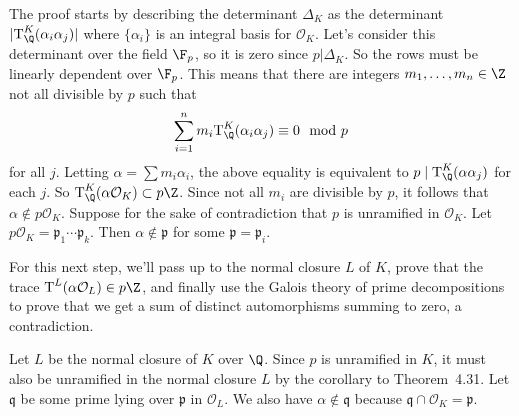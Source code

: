 \documentclass[11pt,letterpaper]{article}
\begin{document}
\begin{solution}
    The proof starts by describing the determinant $\Delta_K$ as the determinant $|\textrm{T}^K_{\Q}(\alpha_i\alpha_j)|$ where $\{\alpha_i\}$ is an integral basis for $\mathcal{O}_K$. Let's consider this determinant over the field $\F_p$, so it is zero since $p|\Delta_K$. So the rows must be linearly dependent over $\F_p$. This means that there are integers $m_1,\ldots,m_n\in \Z$ not all divisible by $p$ such that
    \[
        \sum^n_{i=1} m_i \textrm{T}^K_\Q(\alpha_i\alpha_j)\equiv 0\mod p
    \]
    for all $j$. Letting $\alpha = \sum m_i\alpha_i$, the above equality is equivalent to $p \mid \textrm{T}^K_\Q (\alpha \alpha_j)$ for each $j$. So $\textrm{T}^K_{\Q}(\alpha \mathcal{O}_K) \subset p\Z$. Since not all $m_i$ are divisible by $p$, it follows that $\alpha\not\in p\mathcal{O}_K$. Suppose for the sake of contradiction that $p$ is unramified in $\mathcal{O}_K$. Let $p\mathcal{O}_K=\mathfrak{p}_1\cdots \mathfrak{p}_k$. Then $\alpha\not\in \mathfrak{p}$ for some $\mathfrak{p}=\mathfrak{p}_i$. 
    
    For this next step, we'll pass up to the normal closure $L$ of $K$, prove that the trace $\textrm{T}^L(\alpha \mathcal{O}_L)\in p\Z$, and finally use the Galois theory of prime decompositions to prove that we get a sum of distinct automorphisms summing to zero, a contradiction.
    
    Let $L$ be the normal closure of $K$ over $\Q$. Since $p$ is unramified in $K$, it must also be unramified in the normal closure $L$ by the corollary to Theorem~4.31. Let $\mathfrak{q}$ be some prime lying over $\mathfrak{p}$ in $\mathcal{O}_L$. We also have $\alpha\not\in \mathfrak{q}$ because $\mathfrak{q}\cap \mathcal{O}_K = \mathfrak{p}$. 


\end{solution}
\end{document}
